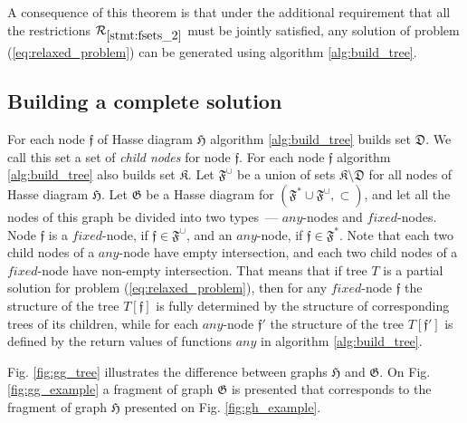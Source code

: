 \documentclass[times, 10pt,twocolumn]{article}
\newcommand{\gD}{\mathfrak{D}}
\newcommand{\gF}{\mathfrak{F}}
\newcommand{\gG}{\mathfrak{G}}
\newcommand{\gH}{\mathfrak{H}}
\newcommand{\gK}{\mathfrak{K}}
\newcommand{\gf}{\mathfrak{f}}
\newcommand{\cR}{\mathcal{R}}
\newcommand{\gFs}{\gF^*}
\newcommand{\gFu}{\gF^{\cup}}
\newcommand{\any}{\textit{any}}
\newcommand{\fixed}{\textit{fixed}}
\begin{document}
A consequence of this theorem is that under the additional requirement
that all the restrictions $\cR_{\ref{stmt:fsets_2}}$ must be jointly satisfied,
any solution of problem (\ref{eq:relaxed_problem})
can be generated using algorithm \ref{alg:build_tree}.

\subsection{Building a complete solution}
\label{chapter:full_reconstruction}

For each node $\gf$ of Hasse diagram $\gH$ algorithm \ref{alg:build_tree}
builds set $\gD$.
We call this set a set of \textit{child nodes} for node $\gf$.
For each node $\gf$ algorithm \ref{alg:build_tree} also builds set $\gK$.
Let $\gFu$ be a union of sets $\gK \setminus \gD$ for all nodes
of Hasse diagram $\gH$.
Let $\gG$ be a Hasse diagram for $(\gFs \cup \gFu, \subset)$,
and let all the nodes of this graph be divided into two types~---
$\any$-nodes and $\fixed$-nodes.
Node $\gf$ is a $\fixed$-node, if $\gf \in \gFu$,
and an $\any$-node, if $\gf \in \gFs$.
Note that each two child nodes of a $\any$-node have empty intersection,
and each two child nodes of a $\fixed$-node have non-empty intersection.
That means that if tree $T$ is a partial solution
for problem (\ref{eq:relaxed_problem}),
then for any $\fixed$-node $\gf$ the structure of the tree $T[\gf]$
is fully determined by the structure of corresponding trees of its children,
while for each $\any$-node $\gf'$ the structure of the tree $T[\gf']$
is defined by the return values of functions $\any$
in algorithm \ref{alg:build_tree}.

Fig.  \ref{fig:gg_tree}  illustrates
the difference between graphs $\gH$ and $\gG$.
On Fig. \ref{fig:gg_example} a fragment of graph $\gG$ is presented
that corresponds to the fragment of graph $\gH$
presented on Fig. \ref{fig:gh_example}.
\end{document}
